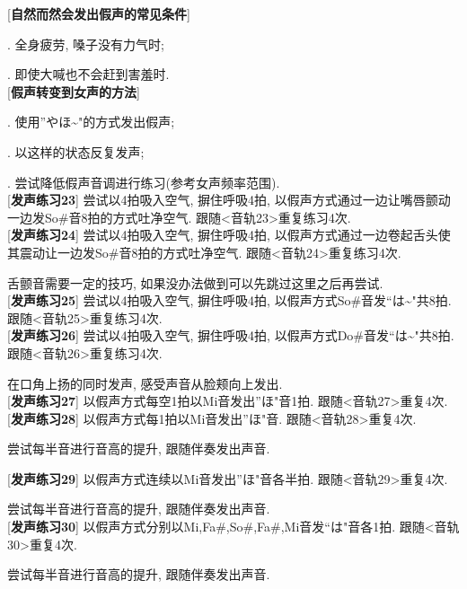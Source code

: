 [\textbf{自然而然会发出假声的常见条件}]\par
{}. 全身疲劳, 嗓子没有力气时;\par
{}. 即使大喊也不会赶到害羞时.\\

[\textbf{假声转变到女声的方法}]\par
{}. 使用''やほ\textasciitilde"的方式发出假声;\par
{}. 以这样的状态反复发声;\par
{}. 尝试降低假声音调进行练习(参考女声频率范围).\\

[\textbf{发声练习23}] 尝试以4拍吸入空气, 摒住呼吸4拍, 以假声方式通过一边让嘴唇颤动一边发So\#音8拍的方式吐净空气. 跟随<音轨23>重复练习4次.\\

[\textbf{发声练习24}] 尝试以4拍吸入空气, 摒住呼吸4拍, 以假声方式通过一边卷起舌头使其震动让一边发So\#音8拍的方式吐净空气. 跟随<音轨24>重复练习4次.\par
\qquad 舌颤音需要一定的技巧, 如果没办法做到可以先跳过这里之后再尝试.\\

[\textbf{发声练习25}] 尝试以4拍吸入空气, 摒住呼吸4拍, 以假声方式So\#音发``は\textasciitilde"共8拍. 跟随<音轨25>重复练习4次.\\

[\textbf{发声练习26}] 尝试以4拍吸入空气, 摒住呼吸4拍, 以假声方式Do\#音发``は\textasciitilde"共8拍. 跟随<音轨26>重复练习4次.\par
\qquad 在口角上扬的同时发声, 感受声音从脸颊向上发出.\\

[\textbf{发声练习27}] 以假声方式每空1拍以Mi音发出''ほ"音1拍. 跟随<音轨27>重复4次.\\

[\textbf{发声练习28}] 以假声方式每1拍以Mi音发出''ほ"音. 跟随<音轨28>重复4次.\par
\qquad 尝试每半音进行音高的提升, 跟随伴奏发出声音.

\clearpage

[\textbf{发声练习29}] 以假声方式连续以Mi音发出''ほ"音各半拍. 跟随<音轨29>重复4次.\par
\qquad 尝试每半音进行音高的提升, 跟随伴奏发出声音.\\

[\textbf{发声练习30}] 以假声方式分别以Mi,Fa\#,So\#,Fa\#,Mi音发``は"音各1拍. 跟随<音轨30>重复4次.\par
\qquad 尝试每半音进行音高的提升, 跟随伴奏发出声音.\\

